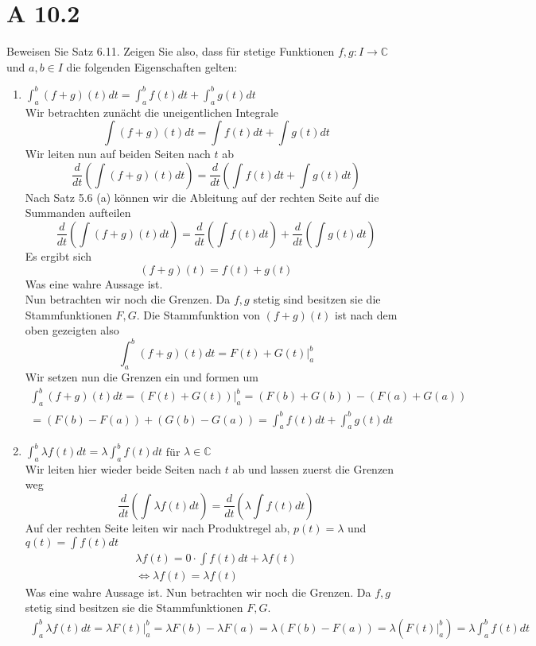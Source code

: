 \documentclass{article}
\begin{document}
    \section*{A 10.2}
    Beweisen Sie Satz 6.11. Zeigen Sie also, dass für stetige Funktionen \(f, g : I \to \mathbb{C}\) und \(a, b \in I\) die folgenden Eigenschaften gelten:
    \begin{enumerate}[ label = (\alph*) ]
        \item \( \int_a^b (f+g)(t) dt = \int_a^b f(t) dt + \int_a^b g(t) dt \) \\
        Wir betrachten zunächt die uneigentlichen Integrale
        \[ \int (f+g)(t) dt = \int f(t) dt + \int g(t) dt \]
        Wir leiten nun auf beiden Seiten nach \(t\) ab
        \[ \frac{d}{dt} \left( \int (f+g)(t) dt \right) =  \frac{d}{dt} \left( \int f(t) dt + \int g(t) dt \right) \]
        Nach Satz 5.6 (a) können wir die Ableitung auf der rechten Seite auf die Summanden aufteilen
        \[ \frac{d}{dt} \left( \int (f+g)(t) dt \right) =  \frac{d}{dt} \left( \int f(t) dt \right) + \frac{d}{dt} \left( \int g(t) dt \right) \]
        Es ergibt sich
        \[(f+g)(t) = f(t) + g(t)\]
        Was eine wahre Aussage ist. \\
        Nun betrachten wir noch die Grenzen. Da \(f, g\) stetig sind besitzen sie die Stammfunktionen \(F, G\).
        Die Stammfunktion von \((f+g)(t)\) ist nach dem oben gezeigten also
        \[ \int_a^b (f+g)(t) dt = F(t) + G(t) |_a^b\]
        Wir setzen nun die Grenzen ein und formen um
        \begin{gather*}
            \int_a^b (f+g)(t) dt = (F(t) + G(t)) |_a^b = (F(b) + G(b)) - (F(a) + G(a)) \\
            = (F(b) - F(a)) + (G(b) - G(a)) = \int_a^b f(t) dt + \int_a^b g(t) dt
        \end{gather*}

        \item \( \int_a^b \lambda f(t) dt = \lambda \int_a^b f(t) dt \) für \(\lambda \in \mathbb{C} \) \\
        Wir leiten hier wieder beide Seiten nach \(t\) ab und lassen zuerst die Grenzen weg
        \[ \frac{d}{dt} \left( \int \lambda f(t) dt \right) = \frac{d}{dt} \left( \lambda \int f(t) dt \right) \]
        Auf der rechten Seite leiten wir nach Produktregel ab, \( p(t) = \lambda \) und \(q(t) = \int f(t) dt  \)
        \begin{gather*}
            \lambda f(t) = 0 \cdot \int f(t) dt + \lambda f(t) \\
            \Leftrightarrow \lambda f(t) = \lambda f(t) 
        \end{gather*}
        Was eine wahre Aussage ist.
        Nun betrachten wir noch die Grenzen. Da \(f, g\) stetig sind besitzen sie die Stammfunktionen \(F, G\).
        \begin{gather*}
            \int_a^b \lambda f(t) dt = \lambda F(t) |_a^b = \lambda F(b) - \lambda F(a) = \lambda (F(b) - F(a)) = \lambda (F(t) |_a^b) = \lambda \int_a^b f(t) dt
        \end{gather*}


\end{enumerate}
\end{document}

